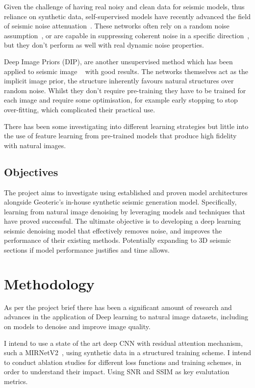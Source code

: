 \documentclass[project-plan]{report-template}
\begin{document}
Given the challenge of having real noisy and clean data for seismic models, thus reliance on synthetic data, self-supervised models have recently advanced the field of seismic noise attenuation~\cite{liu2023tracewise}. These networks often rely on a random noise assumption~\cite{birnie2021potential}, or are capable in suppressing coherent noise in  a specific direction~\cite{liu2023tracewise}, but they don't perform as well with real dynamic noise properties.

Deep Image Priors (DIP), are another unsupervised method which has been applied to seismic image ~\cite{lie2024seismicdip} with good results. The networks themselves act as the implicit image prior, the structure inherently favours natural structures over random noise. Whilst they don't require pre-training they have to be trained for each image and require some optimisation, for example early stopping to stop over-fitting, which complicated their practical use.

There has been some investigating into different learning strategies but little into the use of feature learning from pre-trained models that produce high fidelity with natural images.


\subsection{Objectives}
The project aims to investigate using established and proven model architectures alongside Geoteric's in-house synthetic seismic generation model. Specifically, learning from natural image denoising by leveraging models and techniques that have proved successful. The ultimate objective is to developing a deep learning seismic denoising model that effectively removes noise, and improves the performance of their existing methods. Potentially expanding to 3D seismic sections if model performance justifies and time allows.


\section{Methodology}
As per the project brief there has been a significant amount of research and advances in the application of Deep learning to natural image datasets, including on models to denoise and improve image quality.

I intend to use a state of the art deep CNN with residual attention mechanism, such a MIRNetV2~\cite{zamir2022mirnetv2}, using synthetic data in a structured training scheme. I intend to conduct ablation studies for different loss functions and training schemes, in order to understand their impact. Using SNR and SSIM as key evalutation metrics.
\end{document}
